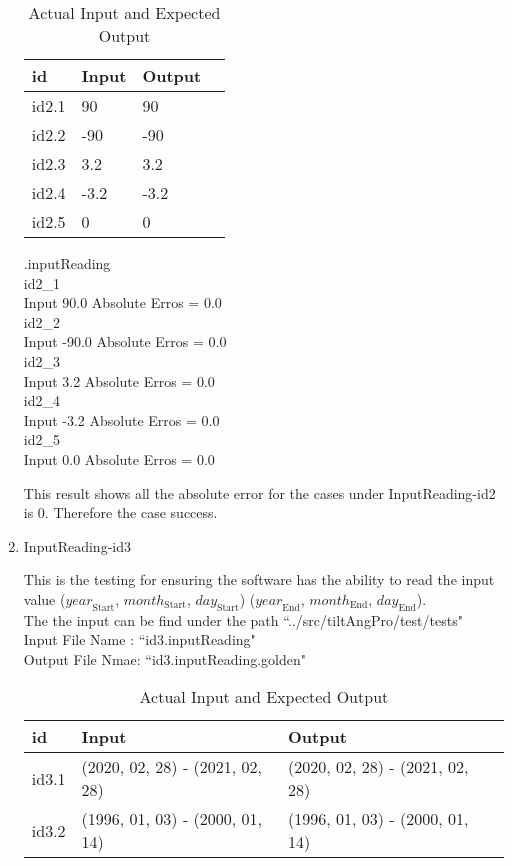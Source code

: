 \documentclass[12pt, titlepage]{article}
\begin{document}
\begin{enumerate}
\begin{table}[h!]
\centering
\noindent \begin{tabular}{l l l l} 
    \toprule		
    \textbf{id} & \textbf{Input} & \textbf{Output}\\ 
	\midrule
   id2.1 &  90  & 90\\
   id2.2 & -90  & -90\\
   id2.3 & 3.2  & 3.2\\
   id2.4 & -3.2  & -3.2\\
   id2.5 & 0  & 0\\
    \bottomrule
  \end{tabular}
\caption{Actual Input and Expected Output}
\end{table}


\begin{center}

.inputReading\\
id2\_1\\
Input 90.0 Absolute Erros = 0.0\\
id2\_2\\
Input -90.0 Absolute Erros = 0.0\\
id2\_3\\
Input 3.2 Absolute Erros = 0.0\\
id2\_4\\
Input -3.2 Absolute Erros = 0.0\\
id2\_5\\
Input 0.0 Absolute Erros = 0.0\\
\end{center}

This result shows all the absolute error for the cases under InputReading-id2 is 0. Therefore the case success.

\item{InputReading-id3\\}

This is the testing for ensuring the software has the ability to read the input value  ($\mathit{year}_\text{Start}$, $\mathit{month}_\text{Start}$, $\mathit{day}_\text{Start}$)  ($\mathit{year}_\text{End}$, $\mathit{month}_\text{End}$, $\mathit{day}_\text{End}$).\\


The the input can be find under the path ``../src/tiltAngPro/test/tests"\\
Input File Name : ``id3.inputReading"\\
Output File Nmae: ``id3.inputReading.golden"

\begin{table}[h!]
\centering
\noindent \begin{tabular}{l l l l} 
    \toprule		
    \textbf{id} & \textbf{Input} & \textbf{Output}\\ 
	\midrule
   id3.1 & (2020, 02, 28) - (2021, 02, 28) & (2020, 02, 28) - (2021, 02, 28)\\
   id3.2 & (1996, 01, 03) - (2000, 01, 14)  & (1996, 01, 03) - (2000, 01, 14) \\
    \bottomrule
  \end{tabular}
\caption{Actual Input and Expected Output}
\end{table}


\end{enumerate}
\end{document}
